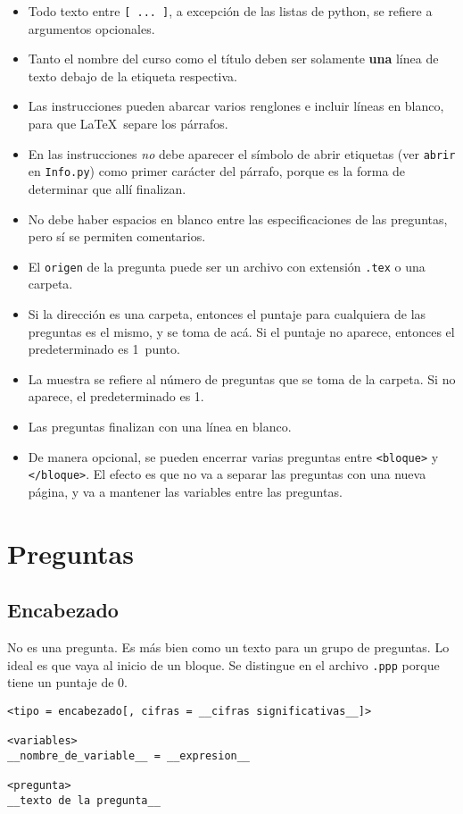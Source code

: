 \documentclass[12pt]{article}
\theoremstyle{definition}
\begin{document}
\begin{itemize}
  \item Todo texto entre \verb|[ ... ]|, a excepci\'on de las listas de python, se refiere a argumentos opcionales.
  \item Tanto el nombre del curso como el título deben ser solamente \textbf{una} línea de texto debajo de la etiqueta respectiva.
  \item Las instrucciones pueden abarcar varios renglones e incluir líneas en blanco, para que \LaTeX\ separe los párrafos. 
  \item En las instrucciones \emph{no} debe aparecer el símbolo de abrir etiquetas (ver \verb|abrir| en \verb|Info.py|) como primer carácter del párrafo, porque es la forma de determinar que allí finalizan.
  \item No debe haber espacios en blanco entre las especificaciones de las preguntas, pero sí se permiten comentarios.
  \item El \verb|origen| de la pregunta puede ser un archivo con extensión \verb|.tex| o una carpeta.
  \item Si la dirección es una carpeta, entonces el puntaje para cualquiera de las preguntas es el mismo, y se toma de acá. Si el puntaje no aparece, entonces el predeterminado es 1~punto.
  \item La muestra se refiere al n\'umero de preguntas que se toma de la carpeta. Si no aparece, el predeterminado es 1.
  \item Las preguntas finalizan con una línea en blanco.
  \item De manera opcional, se pueden encerrar varias preguntas entre \verb|<bloque>| y \verb|</bloque>|. El efecto es que no va a separar las preguntas con una nueva p\'agina, y va a mantener las variables entre las preguntas.
\end{itemize}

\section{Preguntas}

\subsection{Encabezado}
No es una pregunta. Es m\'as bien como un texto para un grupo de preguntas. Lo ideal es que vaya al inicio de un bloque. Se distingue en el archivo \verb|.ppp| porque tiene un puntaje de 0.

\begin{verbatim}
<tipo = encabezado[, cifras = __cifras significativas__]>

<variables>
__nombre_de_variable__ = __expresion__

<pregunta>
__texto de la pregunta__
\end{verbatim}
\end{document}
